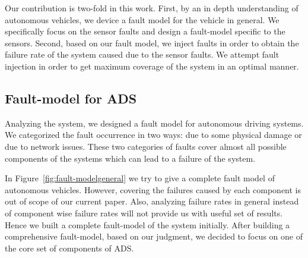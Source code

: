 

Our contribution is two-fold in this work. First, by an in depth understanding of autonomous vehicles, we device a fault model for the vehicle in general. We specifically focus on the sensor faults and design a fault-model specific to the sensors. Second, based on our fault model, we inject faults in order to obtain the failure rate of the system caused due to the sensor faults. We attempt fault injection in order to get maximum coverage of the system in an optimal manner.

\subsection{Fault-model for ADS}
Analyzing the system, we designed a fault model for autonomous driving systems. We categorized the fault occurrence in two ways: due to some physical damage or due to network issues. These two categories of faults cover almost all possible components of the systems which can lead to a failure of the system. 






In Figure~\ref{fig:fault-modelgeneral} we try to give a complete fault model of autonomous vehicles. However, covering the failures caused by each component is out of scope of our current paper. Also, analyzing failure rates in general instead of component wise failure rates will not provide us with useful set of results. Hence we built a complete fault-model of the system initially. After building a comprehensive fault-model, based on our judgment, we decided to focus on one of the core set of components of ADS.

